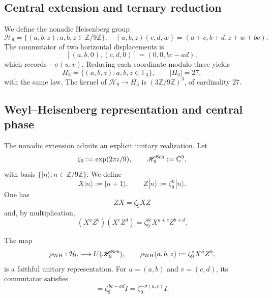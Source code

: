 \subsection{Central extension and ternary reduction}

We define the nonadic Heisenberg group
\begin{equation}
 \mathcal H_9=\{(a,b,z):a,b,z\in\mathbb Z/9\mathbb Z\},
 \quad
 (a,b,z)(c,d,w)=(a+c,b+d,z+w+bc).
 \label{p12-83-c20-s6:eq:heisenberg-9-nuevo}
\end{equation}
The commutator of two horizontal displacements is
\[
 [(a,b,0),(c,d,0)]=(0,0,bc-ad),
\]
which records \(-\sigma(u,v)\). Reducing each coordinate modulo three
yields
\begin{equation}
 H_3=\{(a,b,z):a,b,z\in\mathbb F_3\},\qquad |H_3|=27,
 \label{p12-83-c20-s6:eq:heisenberg-3-nuevo}
\end{equation}
with the same law. The kernel of
\(\mathcal H_9\to H_3\) is
\((3\mathbb Z/9\mathbb Z)^3\), of cardinality 27.

\subsection{Weyl--Heisenberg representation and central phase}

The nonadic extension admits an explicit unitary realization. Let
\[
 \zeta_9:=\exp(2\pi i/9),
 \qquad
 \mathscr H_9^{\rm Sch}:=\mathbb C^9,
\]
with basis \(\{|n\rangle:n\in\mathbb Z/9\mathbb Z\}\). We define
\begin{equation}
 X|n\rangle:=|n+1\rangle,
 \qquad
 Z|n\rangle:=\zeta_9^n|n\rangle.
 \label{p12-83-c20-s6:eq:weyl-desplazamiento-fase-u029}
\end{equation}
One has
\[
 ZX=\zeta_9XZ
\]
and, by multiplication,
\begin{equation}
 (X^aZ^b)(X^cZ^d)
 =\zeta_9^{bc}X^{a+c}Z^{b+d}.
 \label{p12-83-c20-s6:eq:cociclo-weyl-nonadico-u029}
\end{equation}

\begin{theorem}
\label{p12-83-c20-s6:thm:representacion-weyl-heisenberg-u029}
The map
\begin{equation}
 \rho_{\rm WH}:\mathcal H_9\longrightarrow
 U(\mathscr H_9^{\rm Sch}),
 \qquad
 \rho_{\rm WH}(a,b,z):=\zeta_9^zX^aZ^b,
 \label{p12-83-c20-s6:eq:representacion-weyl-heisenberg-u029}
\end{equation}
is a faithful unitary representation. For
\(u=(a,b)\) and \(v=(c,d)\), its commutator satisfies
\begin{equation}
 [\rho_{\rm WH}(u,0),\rho_{\rm WH}(v,0)]
 =\zeta_9^{\,bc-ad}I
 =\zeta_9^{-\sigma(u,v)}I.
 \label{p12-83-c20-s6:eq:conmutador-weyl-holonomia-u029}
\end{equation}
\end{theorem}

